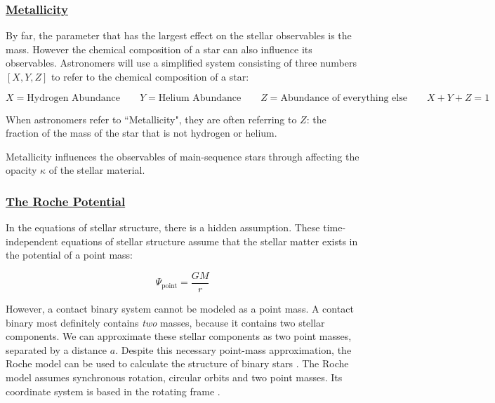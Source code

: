 \documentclass[12pt]{article} %
\numberwithin{equation}{section} %
\begin{document}
\subsubsection[Metallicity]{\hyperlink{toc}{Metallicity}} \label{sec: Metallicity}

By far, the parameter that has the largest effect on the stellar observables is the mass. However the chemical composition of a star can also influence its observables. Astronomers will use a simplified system consisting of three numbers $[X,Y,Z]$ to refer to the chemical composition of a star:

\begin{equation} \label{def_metallicity}
X = \text{Hydrogen Abundance} \qquad Y = \text{Helium Abundance} \qquad Z = \text{Abundance of everything else} \qquad X + Y + Z = 1
\end{equation}

When astronomers refer to ``Metallicity", they are often referring to $Z$: the fraction of the mass of the star that is not hydrogen or helium.

Metallicity influences the observables of main-sequence stars through affecting the opacity $\kappa$ of the stellar material.


\subsubsection[The Roche Potential]{\hyperlink{toc}{The Roche Potential}} \label{sec: The Roche Potential}

In the equations of stellar structure, there is a hidden assumption. These time-independent equations of stellar structure assume that the stellar matter exists in the potential of a point mass:

\begin{equation} \label{point_mass}
\Psi_{\text{point}} = \frac{GM}{r}
\end{equation}

However, a contact binary system cannot be modeled as a point mass. A contact binary most definitely contains \emph{two} masses, because it contains two stellar components. We can approximate these stellar components as two point masses, separated by a distance $a$. Despite this necessary point-mass approximation, the Roche model can be used to calculate the structure of binary stars \citep{kippenhahn1970simple}. The Roche model assumes synchronous rotation, circular orbits and two point masses. Its coordinate system is based in the rotating frame \citep{kopal1959close}.
\end{document}
